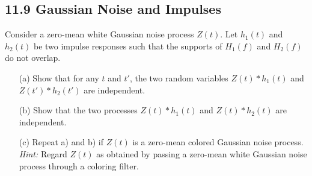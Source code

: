 \documentclass[../main.tex]{subfiles}
\begin{document}
\subsection*{11.9 Gaussian Noise and Impulses}
Consider a zero-mean white Gaussian noise process $Z(t)$. Let $h_1(t)$ and $h_2(t)$ be two impulse responses such that the supports of $H_1(f)$
and $H_2(f)$ do not overlap.
\begin{enumerate}
    \item[(a)] Show that for any $t$ and $t'$, the two random variables $Z(t) * h_1(t)$
    and $Z(t') * h_2(t')$ are independent.
    
    \item[(b)] Show that the two processes $Z(t) * h_1(t)$ and $Z(t) * h_2(t)$ are
    independent.
    
    \item[(c)] Repeat a) and b) if $Z(t)$ is a zero-mean colored Gaussian noise
    process. \textit{Hint:} Regard $Z(t)$ as obtained by passing a zero-mean
    white Gaussian noise process through a coloring filter.
\end{enumerate}
\end{document}
